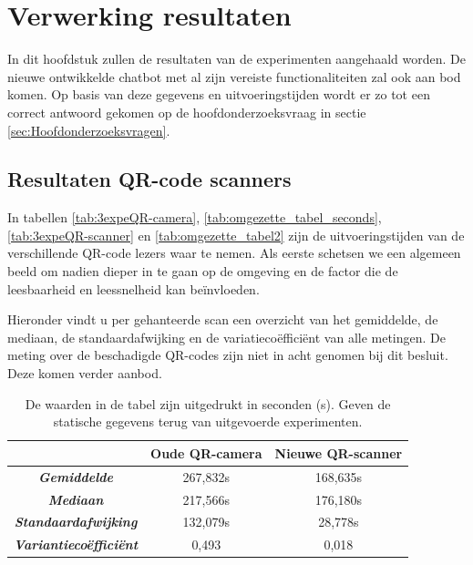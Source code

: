 
\chapter{Verwerking resultaten}%
\label{ch:verwerkingresultaten}

In dit hoofdstuk zullen de resultaten van de experimenten aangehaald worden. De nieuwe ontwikkelde chatbot met al zijn vereiste functionaliteiten zal ook aan bod komen. Op basis van deze gegevens en uitvoeringstijden wordt er zo tot een correct antwoord gekomen op de hoofdonderzoeksvraag in sectie \ref{sec:Hoofdonderzoeksvragen}.


\section{Resultaten QR-code scanners}
\label{sec:resultatenQR-codeScanners}

In tabellen \ref{tab:3expeQR-camera}, \ref{tab:omgezette_tabel_seconds}, \ref{tab:3expeQR-scanner} en \ref{tab:omgezette_tabel2} zijn de uitvoeringstijden van de verschillende QR-code lezers waar te nemen. Als eerste schetsen we een algemeen beeld om nadien dieper in te gaan op de omgeving en de factor die de leesbaarheid en leessnelheid kan beïnvloeden. 

Hieronder vindt u per gehanteerde scan een overzicht van het gemiddelde, de mediaan, de standaardafwijking en de variatiecoëfficiënt van alle metingen. De meting over de beschadigde QR-codes zijn niet in acht genomen bij dit besluit. Deze komen verder aanbod.


\begin{table}[h]
    \centering
    \begin{tabular}{ |c|c|c| }
        \hline
        \multicolumn{1}{|c|}{} & \textbf{Oude QR-camera} & \textbf{Nieuwe QR-scanner} \\       
        \hline
        \textbf{\textit{Gemiddelde}} & 267,832s & 168,635s \\
        \hline
        \textbf{\textit{Mediaan}} & 217,566s & 176,180s \\
        \hline        
        \textbf{\textit{Standaardafwijking}} & 132,079s & 28,778s \\
        \hline
        \textbf{\textit{Variantiecoëfficiënt}} & 0,493 & 0,018 \\
        \hline
    \end{tabular}
    \captionsetup{justification=centering}
    \caption{De waarden in de tabel zijn uitgedrukt in seconden (s). Geven de statische gegevens terug van uitgevoerde experimenten.}
    \label{tab:nieuweScanner}
\end{table}

